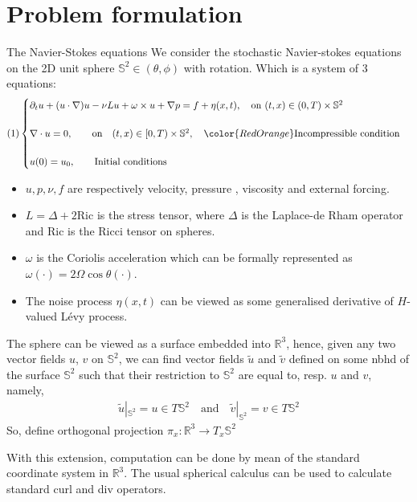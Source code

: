 \documentclass[xcolor=dvipsnames,leqno]{beamer}
\newcommand{\R}{\mathbb{R}}
\begin{document}
\section{Problem formulation}
\begin{frame}[shrink]{The Navier-Stokes equations}
 We consider the stochastic Navier-stokes equations on the 2D unit sphere $\mathbb{S}^2\in (\theta,\phi)$ with rotation. Which is a system of 3 equations:
	\begin{align*}(1)
		\begin{cases}
			\partial_t u+ (u\cdot\nabla)u-\nu L u+\omega\times u+\nabla p=f+\eta(x,t) ,\quad\text{on} \,\, (t, x)\in (0, T)\times\mathbb{S}^2\\
			&\\
			\nabla\cdot u=0,\qquad\text{on} \quad (t, x)\in[0, T)\times\mathbb{S}^2, \quad{\color{RedOrange}\text{Incompressible condition}}\\
			&\\
			u(0)=u_0, \qquad\text{Initial conditions}	
		\end{cases}	
	\end{align*}  
\begin{itemize}
	\item $u, p, \nu, f$ are respectively velocity, pressure , viscosity and external forcing.
	\item $L=\Delta + 2\text{Ric}$ is the stress tensor, where $\Delta$ is the Laplace-de Rham operator and $\text{Ric}$ is the Ricci tensor on spheres.
	\item $\omega$ is the Coriolis acceleration which can be formally represented as $\omega(\cdot) = 2\Omega\cos\theta(\cdot)$.
	\item The noise process $\eta(x,t)$ can be viewed as some generalised derivative of $H$-valued L\'evy process.
\end{itemize}
\end{frame}

\begin{frame}
	The sphere can be viewed as a surface embedded into $\R^3$, hence, given any two vector fields $u$, $v$ on $\mathbb{S}^2$, we can find vector fields $\tilde{u}$ and $\tilde{v}$ defined on some nbhd of the surface $\mathbb{S}^2$ such that their restriction to $\mathbb{S}^2$ are equal to, resp. $u$ and $v$, namely,
	\begin{align*}
		\tilde{u}|_{\mathbb{S}^2}=u\in T\mathbb{S}^2\quad\text{and}\quad\tilde{v}|_{\mathbb{S}^2}=v\in T\mathbb{S}^2 
	\end{align*}
So, define orthogonal projection $\pi_x:\R^3\to T_x \mathbb{S}^2$

With this extension, computation can be done by mean of the standard coordinate system in $\R^3$. The  usual spherical calculus can be used to calculate standard curl and div operators.
\end{frame}
\end{document}
